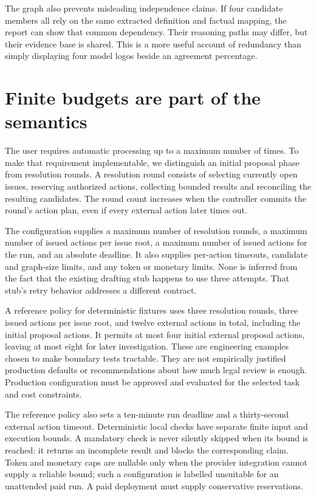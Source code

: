 \documentclass[12pt,a4paper,oneside,openany]{book}
\begin{document}
The graph also prevents misleading independence claims. If four candidate members
all rely on the same extracted definition and factual mapping, the report can
show that common dependency. Their reasoning paths may differ, but their evidence
base is shared. This is a more useful account of redundancy than simply displaying
four model logos beside an agreement percentage.

\section{Finite budgets are part of the semantics}
\label{merge:M06:12}


The user requires automatic processing up to a maximum number of times. To make
that requirement implementable, we distinguish an initial proposal phase from
resolution rounds. A resolution round consists of selecting currently open
issues, reserving authorized actions, collecting bounded results and reconciling
the resulting candidates. The round count increases when the controller commits
the round's action plan, even if every external action later times out.

The configuration supplies a maximum number of resolution rounds, a maximum
number of issued actions per issue root, a maximum number of issued actions for
the run, and an absolute deadline. It also supplies per-action timeouts, candidate
and graph-size limits, and any token or monetary limits. None is inferred from
the fact that the existing drafting stub happens to use three attempts. That
stub's retry behavior addresses a different contract.

A reference policy for deterministic fixtures uses three resolution rounds,
three issued actions per issue root, and twelve external actions in total,
including the initial proposal actions. It permits at most four initial external
proposal actions, leaving at most eight for later investigation. These are
engineering examples chosen to make boundary tests tractable. They are not
empirically justified production defaults or recommendations about how much
legal review is enough. Production configuration must be approved and evaluated
for the selected task and cost constraints.

The reference policy also sets a ten-minute run deadline and a thirty-second
external action timeout. Deterministic local checks have separate finite input
and execution bounds. A mandatory check is never silently skipped when its bound
is reached: it returns an incomplete result and blocks the corresponding claim.
Token and monetary caps are nullable only when the provider integration cannot
supply a reliable bound; such a configuration is labelled unsuitable for an
unattended paid run. A paid deployment must supply conservative reservations.
\end{document}
